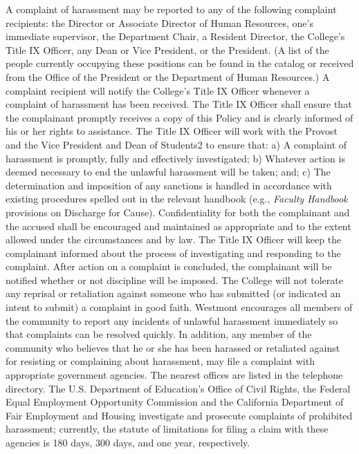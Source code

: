\documentclass[letterpaper, 11pt]{article}
\begin{document}
			A complaint of harassment may be reported to any of the following complaint recipients:  the Director or Associate Director of Human Resources, one's immediate supervisor, the Department Chair, a Resident Director, the College's Title IX Officer, any Dean or Vice President, or the President.  (A list of the people currently occupying these positions can be found in the catalog or received from the Office of the President or the Department of Human Resources.)
			A complaint recipient will notify the College's Title IX Officer whenever a complaint of harassment has been received.  The Title IX Officer shall ensure that the complainant promptly receives a copy of this Policy and is clearly informed of his or her rights to assistance.
			The Title IX Officer will work with the Provost and the Vice President and Dean of Students2 to ensure that:
			a) A complaint of harassment is promptly, fully and effectively investigated;
			b) Whatever action is deemed necessary to end the unlawful harassment will be taken; and;
			c) The determination and imposition of any sanctions is handled in accordance with existing procedures spelled out in the relevant handbook (e.g., \emph{Faculty Handbook} provisions on Discharge for Cause).
			Confidentiality for both the complainant and the accused shall be encouraged and maintained as appropriate and to the extent allowed under the circumstances and by law.
			The Title IX Officer will keep the complainant informed about the process of investigating and responding to the complaint.  After action on a complaint is concluded, the complainant will be notified whether or not discipline will be imposed.  The College will not tolerate any reprisal or retaliation against someone who has submitted (or indicated an intent to submit) a complaint in good faith.
			Westmont encourages all members of the community to report any incidents of unlawful harassment immediately so that complaints can be resolved quickly.  In addition, any member of the community who believes that he or she has been harassed or retaliated against for resisting or complaining about harassment, may file a complaint with appropriate government agencies.  The nearest offices are listed in the telephone directory. The U.S. Department of Education's Office of Civil Rights, the Federal Equal Employment Opportunity Commission and the California Department of Fair Employment and Housing investigate and prosecute complaints of prohibited harassment; currently, the statute of limitations for filing a claim with these agencies is 180 days, 300 days, and one year, respectively.
\end{document}
